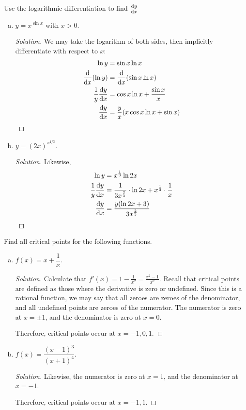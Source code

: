 \question Use the logarithmic differentiation to find $\dv{y}{x}$
\begin{enumerate}[(a)]
  \item $y=x^{\sin x}$ with $x > 0$.
        \begin{proof}[Solution]
          We may take the logarithm of both sides,
          then implicitly differentiate with respect to $x$:
          \begin{align*}
            \ln y           & = \sin x \ln x                                \\
            \dv{x}(\ln y)   & = \dv{x}(\sin x \ln x)                        \\
            \frac{1}{y}\dv{y}{x} & = \cos x\ln x + \frac{\sin x}{x}              \\
            \dv{y}{x}            & = \frac{y}{x}(x\cos x\ln x + \sin x) \qedhere
          \end{align*}

        \end{proof}
  \item $y=(2x)^{x^{1/3}}$.
        \begin{proof}[Solution]
          Likewise,
          \begin{align*}
            \ln y       & = x^{\frac13}\ln 2x                                                 \\
            \frac1y\dv{y}{x} & = \frac{1}{3x^{\frac23}}\cdot \ln 2x + x^{\frac13}\cdot \frac{1}{x} \\
            \dv{y}{x}        & = \frac{y(\ln 2x + 3)}{3x^{\frac23}} \qedhere
          \end{align*}
        \end{proof}
\end{enumerate}


\question Find all critical points for the following functions.
\begin{enumerate}[(a)]
  \item $f(x)=x+\dfrac{1}{x}$.
        \begin{proof}[Solution]
          Calculate that $f'(x) = 1 - \frac{1}{x^2} = \frac{x^2-1}{x^2}$.
          Recall that critical points are defined as those where the derivative is zero or undefined.
          Since this is a rational function, we may say that all zeroes are zeroes of the denominator,
          and all undefined points are zeroes of the numerator.
          The numerator is zero at $x=\pm1$, and the denominator is zero at $x=0$.

          Therefore, critical points occur at $x=-1,0,1$.
        \end{proof}
  \item $f(x)=\dfrac{(x-1)^3}{(x+1)^4}$.
        \begin{proof}[Solution]
          Likewise, the numerator is zero at $x=1$, and the denominator at $x=-1$.

          Therefore, critical points occur at $x=-1,1$.
        \end{proof}
\end{enumerate}



